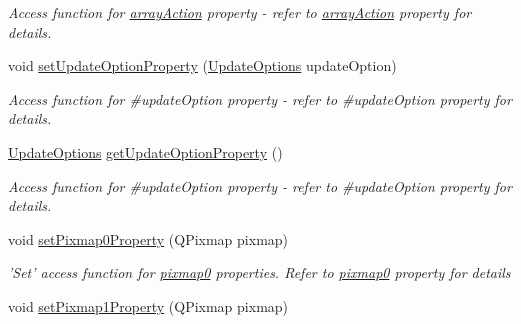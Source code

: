 \begin{DoxyCompactItemize}
\begin{DoxyCompactList}\small\item\em Access function for \hyperlink{classQELabel_a977fd9a4156e6fa13213a03bc9168be2}{arrayAction} property -\/ refer to \hyperlink{classQELabel_a977fd9a4156e6fa13213a03bc9168be2}{arrayAction} property for details. \end{DoxyCompactList}\item 
\hypertarget{classQELabel_a9001b23596203bd17d60683a9e65e26f}{
void \hyperlink{classQELabel_a9001b23596203bd17d60683a9e65e26f}{setUpdateOptionProperty} (\hyperlink{classQELabel_aae708a1c23d06d625b4f2f87bdc3fbe4}{UpdateOptions} updateOption)}
\label{classQELabel_a9001b23596203bd17d60683a9e65e26f}

\begin{DoxyCompactList}\small\item\em Access function for \#updateOption property -\/ refer to \#updateOption property for details. \end{DoxyCompactList}\item 
\hypertarget{classQELabel_a70f8648d2b425d95f6a391a170ef0b0c}{
\hyperlink{classQELabel_aae708a1c23d06d625b4f2f87bdc3fbe4}{UpdateOptions} \hyperlink{classQELabel_a70f8648d2b425d95f6a391a170ef0b0c}{getUpdateOptionProperty} ()}
\label{classQELabel_a70f8648d2b425d95f6a391a170ef0b0c}

\begin{DoxyCompactList}\small\item\em Access function for \#updateOption property -\/ refer to \#updateOption property for details. \end{DoxyCompactList}\item 
\hypertarget{classQELabel_a7920d29cbe5462ca7070a4705119cfc3}{
void \hyperlink{classQELabel_a7920d29cbe5462ca7070a4705119cfc3}{setPixmap0Property} (QPixmap pixmap)}
\label{classQELabel_a7920d29cbe5462ca7070a4705119cfc3}

\begin{DoxyCompactList}\small\item\em 'Set' access function for \hyperlink{classQELabel_ad99c4d55198c39bea42eb391c71e29aa}{pixmap0} properties. Refer to \hyperlink{classQELabel_ad99c4d55198c39bea42eb391c71e29aa}{pixmap0} property for details \end{DoxyCompactList}\item 
\hypertarget{classQELabel_a24798b9f58860ee964e5abcd12f5f6c0}{
void \hyperlink{classQELabel_a24798b9f58860ee964e5abcd12f5f6c0}{setPixmap1Property} (QPixmap pixmap)}
\label{classQELabel_a24798b9f58860ee964e5abcd12f5f6c0}


\end{DoxyCompactItemize}
